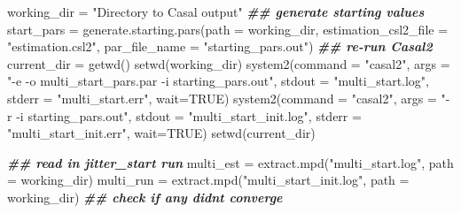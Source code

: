 \documentclass[
]{book}
\newenvironment{Shaded}{\begin{snugshade}}{\end{snugshade}}
\newcommand{\AttributeTok}[1]{\textcolor[rgb]{0.77,0.63,0.00}{#1}}
\newcommand{\ConstantTok}[1]{\textcolor[rgb]{0.00,0.00,0.00}{#1}}
\newcommand{\DocumentationTok}[1]{\textcolor[rgb]{0.56,0.35,0.01}{\textbf{\textit{#1}}}}
\newcommand{\FunctionTok}[1]{\textcolor[rgb]{0.00,0.00,0.00}{#1}}
\newcommand{\NormalTok}[1]{#1}
\newcommand{\OtherTok}[1]{\textcolor[rgb]{0.56,0.35,0.01}{#1}}
\newcommand{\StringTok}[1]{\textcolor[rgb]{0.31,0.60,0.02}{#1}}
\begin{document}
\begin{Shaded}
\begin{Highlighting}[]
\NormalTok{working\_dir }\OtherTok{=} \StringTok{"Directory to Casal output"}
\DocumentationTok{\#\# generate starting values}
\NormalTok{start\_pars }\OtherTok{=} \FunctionTok{generate.starting.pars}\NormalTok{(}\AttributeTok{path =}\NormalTok{ working\_dir, }
                                    \AttributeTok{estimation\_csl2\_file  =} \StringTok{"estimation.csl2"}\NormalTok{,}
                                    \AttributeTok{par\_file\_name =} \StringTok{"starting\_pars.out"}\NormalTok{)}
\DocumentationTok{\#\# re{-}run Casal2}
\NormalTok{current\_dir }\OtherTok{=} \FunctionTok{getwd}\NormalTok{()}
\FunctionTok{setwd}\NormalTok{(working\_dir)}
\FunctionTok{system2}\NormalTok{(}\AttributeTok{command =} \StringTok{"casal2"}\NormalTok{, }\AttributeTok{args =} \StringTok{"{-}e {-}o multi\_start\_pars.par {-}i starting\_pars.out"}\NormalTok{,}
        \AttributeTok{stdout =} \StringTok{"multi\_start.log"}\NormalTok{,}
        \AttributeTok{stderr =} \StringTok{"multi\_start.err"}\NormalTok{, }\AttributeTok{wait=}\ConstantTok{TRUE}\NormalTok{)}
\FunctionTok{system2}\NormalTok{(}\AttributeTok{command =} \StringTok{"casal2"}\NormalTok{, }\AttributeTok{args =} \StringTok{"{-}r {-}i starting\_pars.out"}\NormalTok{,}
        \AttributeTok{stdout =} \StringTok{"multi\_start\_init.log"}\NormalTok{,}
        \AttributeTok{stderr =} \StringTok{"multi\_start\_init.err"}\NormalTok{, }\AttributeTok{wait=}\ConstantTok{TRUE}\NormalTok{)}
\FunctionTok{setwd}\NormalTok{(current\_dir)}

\DocumentationTok{\#\# read in jitter\_start run}
\NormalTok{multi\_est }\OtherTok{=} \FunctionTok{extract.mpd}\NormalTok{(}\StringTok{"multi\_start.log"}\NormalTok{, }\AttributeTok{path =}\NormalTok{ working\_dir)}
\NormalTok{multi\_run }\OtherTok{=} \FunctionTok{extract.mpd}\NormalTok{(}\StringTok{"multi\_start\_init.log"}\NormalTok{, }\AttributeTok{path =}\NormalTok{ working\_dir)}
\DocumentationTok{\#\# check if any didn\textquotesingle{}t converge}


\end{Highlighting}
\end{Shaded}
\end{document}
